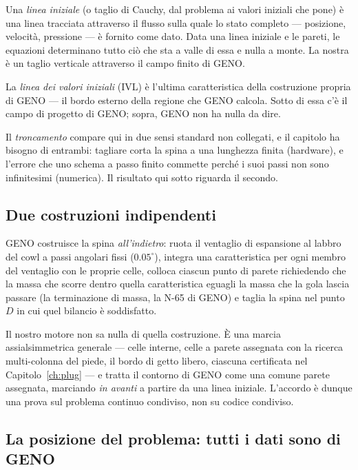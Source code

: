 Una \emph{linea iniziale} (o taglio di Cauchy, dal problema ai valori
iniziali che pone) è una linea tracciata attraverso il flusso sulla
quale lo stato completo --- posizione, velocità, pressione --- è
fornito come dato. Data una linea iniziale e le pareti, le equazioni
determinano tutto ciò che sta a valle di essa e nulla a monte. La
nostra è un taglio verticale attraverso il campo finito di GENO.

La \emph{linea dei valori iniziali} (IVL) è l'ultima caratteristica
della costruzione propria di GENO --- il bordo esterno della regione
che GENO calcola. Sotto di essa c'è il campo di progetto di GENO;
sopra, GENO non ha nulla da dire.

Il \emph{troncamento} compare qui in due sensi standard non
collegati, e il capitolo ha bisogno di entrambi: tagliare corta la
spina a una lunghezza finita (hardware), e l'errore che uno schema a
passo finito commette perché i suoi passi non sono infinitesimi
(numerica). Il risultato qui sotto riguarda il secondo.

\subsection{Due costruzioni indipendenti}

GENO costruisce la spina \emph{all'indietro}: ruota il ventaglio di
espansione al labbro del cowl a passi angolari fissi
($0.05^{\circ}$), integra una caratteristica per ogni membro del
ventaglio con le proprie celle, colloca ciascun punto di parete
richiedendo che la massa che scorre dentro quella caratteristica
eguagli la massa che la gola lascia passare (la terminazione di
massa, la N-65 di GENO) e taglia la spina nel punto $D$ in cui quel
bilancio è soddisfatto.

Il nostro motore non sa nulla di quella costruzione. È una marcia
assialsimmetrica generale --- celle interne, celle a parete assegnata
con la ricerca multi-colonna del piede, il bordo di getto libero,
ciascuna certificata nel Capitolo~\ref{ch:plug} --- e tratta il
contorno di GENO come una comune parete assegnata, marciando
\emph{in avanti} a partire da una linea iniziale. L'accordo è dunque
una prova sul problema continuo condiviso, non su codice condiviso.

\subsection{La posizione del problema: tutti i dati sono di GENO}

